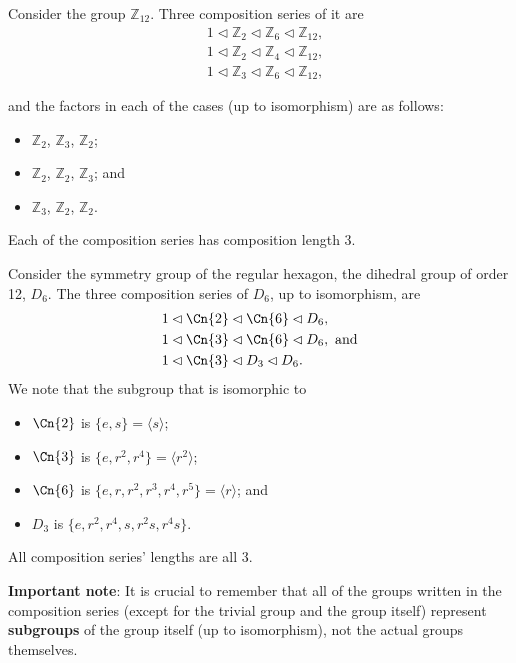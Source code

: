 \begin{example}
    Consider the group $\mathbb{Z}_{12}$. Three composition series of it are
    \begin{align*}
        &1 \lhd \mathbb{Z}_2 \lhd \mathbb{Z}_6 \lhd \mathbb{Z}_{12},\\
        &1 \lhd \mathbb{Z}_2 \lhd \mathbb{Z}_4 \lhd \mathbb{Z}_{12},\\
        &1 \lhd \mathbb{Z}_3 \lhd \mathbb{Z}_6 \lhd \mathbb{Z}_{12},
    \end{align*}
    
    and the factors in each of the cases (up to isomorphism) are as follows:
    \begin{itemize}
        \item $\mathbb{Z}_2$, $\mathbb{Z}_3$, $\mathbb{Z}_2$;
        \item $\mathbb{Z}_2$, $\mathbb{Z}_2$, $\mathbb{Z}_3$; and
        \item $\mathbb{Z}_3$, $\mathbb{Z}_2$, $\mathbb{Z}_2$.
    \end{itemize}
    Each of the composition series has composition length 3.
\end{example}

\begin{example}
    Consider the symmetry group of the regular hexagon, the dihedral group of order 12, $D_6$. The three composition series of $D_6$, up to isomorphism, are
    \begin{align*}
        &1 \lhd \Cn{2} \lhd \Cn{6} \lhd D_6,\\
        &1 \lhd \Cn{3} \lhd \Cn{6} \lhd D_6, \text{ and}\\
        &1 \lhd \Cn{3} \lhd D_3 \lhd D_6.
    \end{align*}
    We note that the subgroup that is isomorphic to
    \begin{itemize}
        \item $\Cn{2}$ is $\{e, s\} = \langle s \rangle$;
        \item $\Cn{3}$ is $\{e, r^2, r^4\} = \langle r^2\rangle$;
        \item $\Cn{6}$ is $\{e, r, r^2, r^3, r^4, r^5\} = \langle r\rangle$; and
        \item $D_3$ is $\{e, r^2, r^4, s, r^2s, r^4s\}$.
    \end{itemize}
    All composition series' lengths are all 3.
\end{example}
\textbf{Important note}: It is crucial to remember that all of the groups written in the composition series (except for the trivial group and the group itself) represent \textbf{subgroups} of the group itself (up to isomorphism), not the actual groups themselves.

